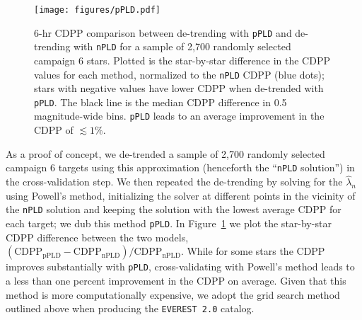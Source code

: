 \documentclass[]{emulateapj}
\begin{document}
\begin{figure}[ht]
  \begin{center}
      \texttt{[image: figures/pPLD.pdf]}
       \caption{6-hr CDPP comparison between de-trending with \texttt{pPLD} and
                de-trending with \texttt{nPLD} for a sample of 2,700 randomly selected campaign 6
                stars. Plotted is the star-by-star difference in the CDPP values for each method,
                normalized to the \texttt{nPLD} CDPP (blue dots); stars with negative values have lower CDPP 
                when de-trended with \texttt{pPLD}. The black line is the median CDPP difference
                in 0.5 magnitude-wide bins. \texttt{pPLD} leads to an average improvement
                in the CDPP of ${\lesssim}1\%$.}
     \label{fig:pPLD}
  \end{center}
\end{figure}

As a proof of concept, we de-trended a sample of 2,700 randomly selected campaign 6 targets
using this approximation (henceforth the ``\texttt{nPLD} solution'') in the cross-validation step. 
We then repeated the de-trending by
solving for the $\hat{\lambda}_n$ using Powell's method, initializing the solver at different
points in the vicinity of the \texttt{nPLD} solution and keeping the solution with the lowest
average CDPP for each target; we dub this method \texttt{pPLD}. In Figure~\ref{fig:pPLD} we plot
the star-by-star CDPP difference between the two models, 
$\mathrm{(CDPP_{pPLD} - CDPP_{nPLD})/CDPP_{nPLD}}$. While for some stars the CDPP improves
substantially with \texttt{pPLD}, cross-validating with Powell's method 
leads to a less than one percent improvement in the CDPP on average. Given that this method
is more computationally expensive, we adopt the grid search method outlined above when
producing the \texttt{EVEREST 2.0} catalog.
\end{document}
